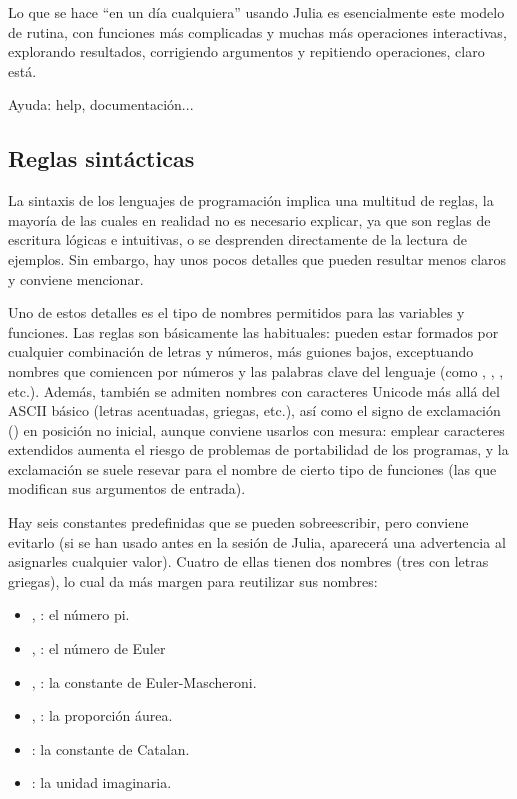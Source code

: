 ﻿\documentclass[spanish]{article}
\begin{document}
Lo que se hace ``en un día cualquiera'' usando Julia es esencialmente este modelo de rutina, con funciones más complicadas y muchas más operaciones interactivas, explorando resultados, corrigiendo argumentos y repitiendo operaciones, claro está.

Ayuda: help, documentación...

\subsection{Reglas sintácticas}

La sintaxis de los lenguajes de programación implica una multitud de reglas, la mayoría de las cuales en realidad no es necesario explicar, ya que son reglas de escritura lógicas e intuitivas, o se desprenden directamente de la lectura de ejemplos. Sin embargo, hay unos pocos detalles que pueden resultar menos claros y conviene mencionar.

Uno de estos detalles es el tipo de nombres permitidos para las variables y funciones. Las reglas son básicamente las habituales: pueden estar formados por cualquier combinación de letras y números, más guiones bajos, exceptuando nombres que comiencen por números y las palabras clave del lenguaje (como , , , etc.). Además, también se admiten nombres con caracteres Unicode más allá del ASCII básico (letras acentuadas, griegas, etc.), así como el signo de exclamación (\code{!}) en posición no inicial, aunque conviene usarlos con mesura: emplear caracteres extendidos aumenta el riesgo de problemas de portabilidad de los programas, y la exclamación se suele resevar para el nombre de cierto tipo de funciones (las que modifican sus argumentos de entrada).

Hay seis constantes predefinidas que se pueden sobreescribir, pero conviene evitarlo (si se han usado antes en la sesión de Julia, aparecerá una advertencia al asignarles cualquier valor). Cuatro de ellas tienen dos nombres (tres con letras griegas), lo cual da más margen para reutilizar sus nombres:

\begin{itemize}
  \item {}, \code{$\pi$}: el número pi.
  \item {}, : el número de Euler
  \item {}, \code{$\gamma$}: la constante de Euler-Mascheroni.
  \item {}, \code{$\Phi$}: la proporción áurea.
  \item {}: la constante de Catalan.
  \item {}: la unidad imaginaria.
\end{itemize}
\end{document}
